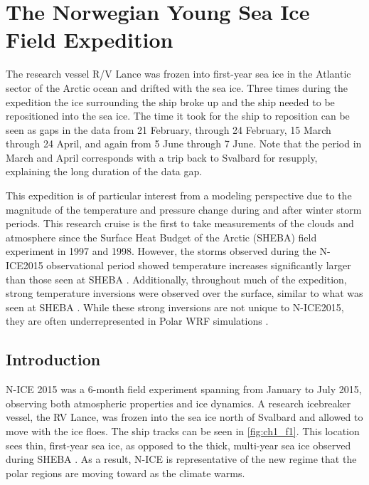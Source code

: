 \chapter{The Norwegian Young Sea Ice Field Expedition}



 The research vessel R/V Lance was frozen into first-year sea ice in the Atlantic sector of the Arctic ocean and drifted with the sea ice. Three times during the expedition the ice surrounding the ship broke up and the ship needed to be repositioned into the sea ice. The time it took for the ship to reposition can be seen as gaps in the data from 21 February, through 24 February, 15 March through 24 April, and again from 5 June through 7 June. Note that the period in March and April corresponds with a trip back to Svalbard for resupply, explaining the long duration of the data gap.

This expedition is of particular interest from a modeling perspective due to the magnitude of the temperature and pressure change during and after winter storm periods. This research cruise is the first to take measurements of the clouds and atmosphere since the Surface Heat Budget of the Arctic (SHEBA) field experiment in 1997 and 1998. However, the storms observed during the N-ICE2015 observational period showed temperature increases significantly larger than those seen at SHEBA \citep{cohen:2017}. Additionally, throughout much of the expedition, strong temperature inversions were observed over the surface, similar to what was seen at SHEBA \citep{kayser:2017}. While these strong inversions are not unique to N-ICE2015, they are often underrepresented in Polar WRF simulations \citep{hines:2015}.

\section{Introduction}

N-ICE 2015 was a 6-month field experiment spanning from January to July 2015, observing both atmospheric properties and ice dynamics. A research icebreaker vessel, the RV Lance, was frozen into the sea ice north of Svalbard and allowed to move with the ice floes. The ship tracks can be seen in \ref{fig:ch1_f1}. This location sees thin, first-year sea ice, as opposed to the thick, multi-year sea ice observed during SHEBA \citep{cohen:2017}. As a result, N-ICE is representative of the new regime that the polar regions are moving toward as the climate warms. 

